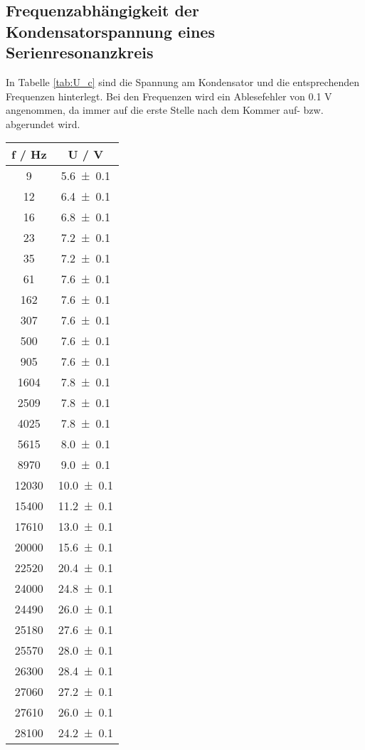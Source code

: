 \subsection{Frequenzabhängigkeit der Kondensatorspannung eines  Serienresonanzkreis}
In Tabelle \ref{tab:U_c} sind die Spannung am Kondensator und die entsprechenden Frequenzen hinterlegt. Bei den Frequenzen wird ein Ablesefehler von 0.1 V angenommen, da immer auf die erste Stelle nach dem Kommer auf- bzw. abgerundet wird.
\begin{table}
  \centering
  \begin{tabular}{c c}
	\toprule
	f / Hz & U / V \\
	\midrule
	9	& \num{5.6 +- 0.1}	\\
	12	& \num{6.4 +- 0.1}	\\
	16	& \num{6.8 +- 0.1}	\\
	23	& \num{7.2 +- 0.1}	\\
	35	& \num{7.2 +- 0.1}	\\
	61	& \num{7.6 +- 0.1}	\\
	162	& \num{7.6 +- 0.1}	\\
	307	& \num{7.6 +- 0.1}	\\
	500	& \num{7.6 +- 0.1}	\\
	905	& \num{7.6 +- 0.1}	\\
	1604	& \num{7.8 +- 0.1}	\\
	2509	& \num{7.8 +- 0.1}	\\
	4025	& \num{7.8 +- 0.1}	\\
	5615	& \num{8.0 +- 0.1}	\\
	8970	& \num{9.0 +- 0.1}	\\
	12030	& \num{10.0 +- 0.1}	\\
	15400	& \num{11.2 +- 0.1}	\\
	17610	& \num{13.0 +- 0.1}	\\
	20000	& \num{15.6 +- 0.1}	\\
	22520	& \num{20.4 +- 0.1}	\\
	24000	& \num{24.8 +- 0.1}	\\
	24490	& \num{26.0 +- 0.1}	\\
	25180	& \num{27.6 +- 0.1}	\\
	25570	& \num{28.0 +- 0.1}	\\
	26300	& \num{28.4 +- 0.1}	\\
	27060	& \num{27.2 +- 0.1}	\\
	27610	& \num{26.0 +- 0.1}	\\
	28100	& \num{24.2 +- 0.1}	\\

\end{tabular}
\end{table}
